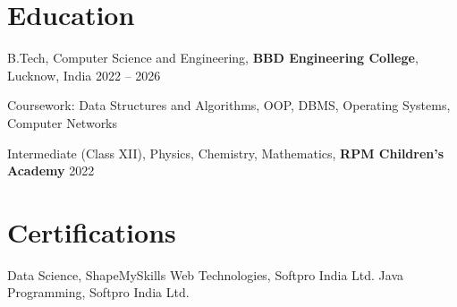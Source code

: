 \documentclass[10pt,a4paper]{article}
\begin{document}
\section{Education}
B.Tech, Computer Science and Engineering, \textbf{BBD Engineering College}, Lucknow, India \hfill 2022 -- 2026\par
Coursework: Data Structures and Algorithms, OOP, DBMS, Operating Systems, Computer Networks\par
Intermediate (Class XII), Physics, Chemistry, Mathematics, \textbf{RPM Children's Academy} \hfill 2022\par

\section{Certifications}
Data Science, ShapeMySkills \textbar{} Web Technologies, Softpro India Ltd. \textbar{} Java Programming, Softpro India Ltd.
\end{document}
